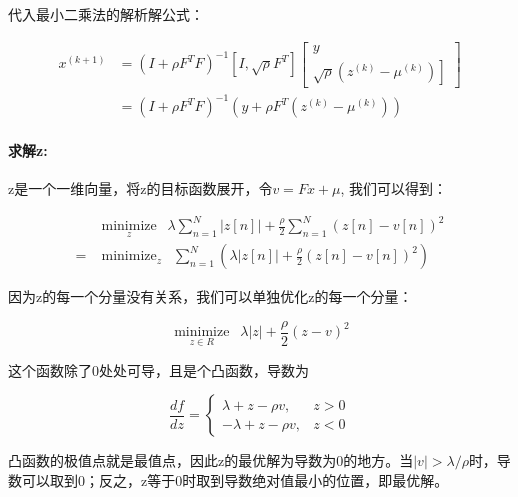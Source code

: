 \documentclass[10pt]{article}
\begin{document}
代入最小二乘法的解析解公式：

\begin{equation}
\begin{aligned}
x ^{(k+1)} &=\left( I +\rho F^TF \right)^{-1}\left[ I, \sqrt{\rho} F^T \right]\left[\begin{array}{c} 
y \\
\left.\sqrt{\rho}\left( z ^{(k)}- \mu ^{(k)}\right)\right]
\end{array}\right] \\
&=\left( I +\rho F^TF \right)^{-1}\left( y +\rho F^T\left( z ^{(k)}- \mu ^{(k)}\right)\right)
\end{aligned}
\end{equation}

\paragraph{求解z: }

z是一个一维向量，将z的目标函数展开，令$v=Fx+\mu$, 我们可以得到：

\begin{equation}
\begin{aligned}
& \underset{z}{\operatorname{minimize}} \enspace \lambda \sum_{n=1}^{N}|z[n]|+\frac{\rho}{2} \sum_{n=1}^{N}(z[n]-v[n])^{2} \\
=& \operatorname{minimize}_{ z } \enspace \sum_{n=1}^{N}\left(\lambda|z[n]|+\frac{\rho}{2}(z[n]-v[n])^{2}\right)
\end{aligned}
\end{equation}


因为z的每一个分量没有关系，我们可以单独优化z的每一个分量：

\begin{equation}
\underset{z \in R }{\operatorname{minimize}} \enspace \lambda|z|+\frac{\rho}{2}(z-v)^{2}
\end{equation}

这个函数除了0处处可导，且是个凸函数，导数为

\begin{equation}
\frac{ d f}{ d z}=\left\{\begin{array}{ll}
\lambda+z-\rho v, & z>0 \\
-\lambda+z-\rho v, & z<0
\end{array}\right.
\end{equation}

凸函数的极值点就是最值点，因此z的最优解为导数为0的地方。当$|v| > \lambda/\rho$时，导数可以取到0；反之，z等于0时取到导数绝对值最小的位置，即最优解。
\end{document}
